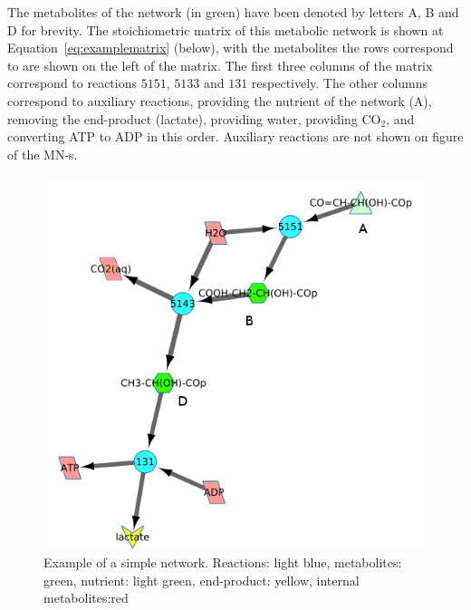 \documentclass[a4paper,12pt]{article}
\begin{document}
	The metabolites of the network (in green) have been denoted by letters A, B and D for brevity. The stoichiometric matrix of this metabolic network is shown at Equation~\ref{eq:examplematrix} (below), with the metabolites the rows correspond to are shown on the left of the matrix. The first three columns of the matrix correspond to reactions $5151$, $5133$ and $131$ respectively. The other columns correspond to auxiliary reactions, providing the nutrient of the network (A), removing the end-product (lactate), providing water, providing CO$_2$, and converting ATP to ADP in this order. Auxiliary reactions are not shown on figure of the MN-s. 

\begin{figure}[htbp]
	\centering
	\includegraphics[width=0.5\linewidth]{initial_network_ABC.png}
	\caption{Example of a simple network. Reactions: light blue, metabolites: green, nutrient: light green, end-product: yellow, internal metabolites:red}
	\label{fig:examplenetwork}
\end{figure}
\end{document}
